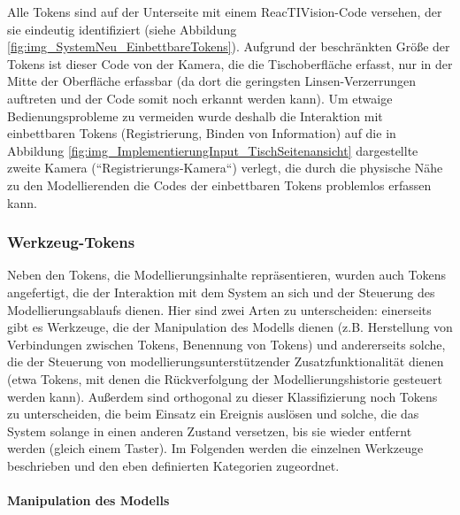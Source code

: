 Alle Tokens sind auf der Unterseite mit einem ReacTIVision-Code versehen, der sie eindeutig identifiziert (siehe Abbildung \ref{fig:img_SystemNeu_EinbettbareTokens}). Aufgrund der beschränkten Größe der Tokens ist dieser Code von der Kamera, die die Tischoberfläche erfasst, nur in der Mitte der Oberfläche erfassbar (da dort die geringsten Linsen-Verzerrungen auftreten und der Code somit noch erkannt werden kann). Um etwaige Bedienungsprobleme zu vermeiden wurde deshalb die Interaktion mit einbettbaren Tokens (Registrierung, Binden von Information) auf die in Abbildung \ref{fig:img_ImplementierungInput_TischSeitenansicht} dargestellte zweite Kamera (“Registrierungs-Kamera“) verlegt, die durch die physische Nähe zu den Modellierenden die Codes der einbettbaren Tokens problemlos erfassen kann.


\subsubsection{Werkzeug-Tokens} %
\label{ssub:werkzeug_tokens}

Neben den Tokens, die Modellierungsinhalte repräsentieren, wurden auch Tokens angefertigt, die der Interaktion mit dem System an sich und der Steuerung des Modellierungsablaufs dienen. Hier sind zwei Arten zu unterscheiden: einerseits gibt es Werkzeuge, die der Manipulation des Modells dienen (z.B. Herstellung von Verbindungen zwischen Tokens, Benennung von Tokens) und andererseits solche, die der Steuerung von modellierungsunterstützender Zusatzfunktionalität dienen (etwa Tokens, mit denen die Rückverfolgung der Modellierungshistorie gesteuert werden kann). Außerdem sind orthogonal zu dieser Klassifizierung noch Tokens zu unterscheiden, die beim Einsatz ein Ereignis auslösen und solche, die das System solange in einen anderen Zustand versetzen, bis sie wieder entfernt werden (gleich einem Taster). Im Folgenden werden die einzelnen Werkzeuge beschrieben und den eben definierten Kategorien zugeordnet.

\paragraph{Manipulation des Modells} %
\label{par:manipulation_des_modells}


